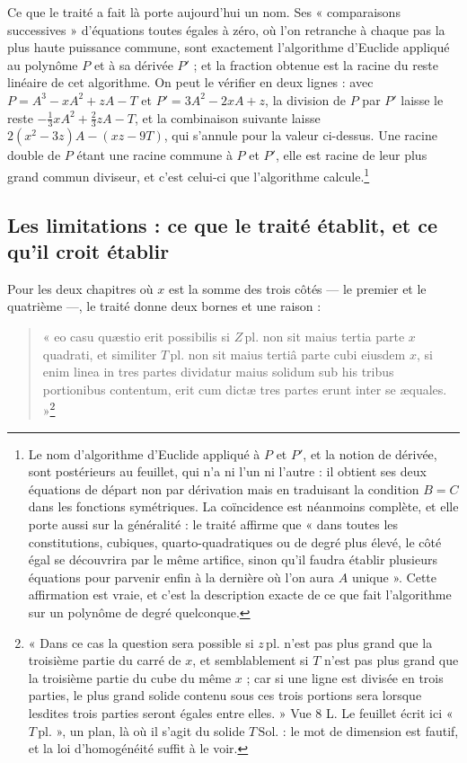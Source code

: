 \documentclass[11pt,a4paper]{article}
\begin{document}
Ce que le traité a fait là porte aujourd'hui un nom. Ses « comparaisons
successives » d'équations toutes égales à zéro, où l'on retranche à chaque pas
la plus haute puissance commune, sont exactement l'algorithme d'Euclide appliqué
au polynôme $P$ et à sa dérivée $P'$ ; et la fraction obtenue est la racine du
reste linéaire de cet algorithme. On peut le vérifier en deux lignes : avec
$P = A^3 - xA^2 + zA - T$ et $P' = 3A^2 - 2xA + z$, la division de $P$ par $P'$
laisse le reste $-\tfrac13 xA^2 + \tfrac23 zA - T$, et la combinaison suivante
laisse $2(x^2-3z)A - (xz - 9T)$, qui s'annule pour la valeur ci-dessus. Une
racine double de $P$ étant une racine commune à $P$ et $P'$, elle est racine de
leur plus grand commun diviseur, et c'est celui-ci que l'algorithme
calcule.\footnote{Le nom d'algorithme d'Euclide appliqué à $P$ et $P'$, et la
notion de dérivée, sont postérieurs au feuillet, qui n'a ni l'un ni l'autre :
il obtient ses deux équations de départ non par dérivation mais en traduisant la
condition $B = C$ dans les fonctions symétriques. La coïncidence est néanmoins
complète, et elle porte aussi sur la généralité : le traité affirme que « dans
toutes les constitutions, cubiques, quarto-quadratiques ou de degré plus élevé,
le côté égal se découvrira par le même artifice, sinon qu'il faudra établir
plusieurs équations pour parvenir enfin à la dernière où l'on aura $A$ unique ».
Cette affirmation est vraie, et c'est la description exacte de ce que fait
l'algorithme sur un polynôme de degré quelconque.}

\subsection*{Les limitations : ce que le traité établit, et ce qu'il croit établir}

Pour les deux chapitres où $x$ est la somme des trois côtés — le premier et le
quatrième —, le traité donne deux bornes et une raison :

\begin{quote}
« eo casu quæstio erit possibilis si $Z\,\mathrm{pl.}$ non sit maius tertia parte
$x$ quadrati, et similiter $T\,\mathrm{pl.}$ non sit maius tertiâ parte cubi
eiusdem $x$, si enim linea in tres partes dividatur maius solidum sub his
tribus portionibus contentum, erit cum dictæ tres partes erunt inter se
æquales. »\footnote{« Dans ce cas la question sera possible si
$z\,\mathrm{pl.}$ n'est pas plus grand que la troisième partie du carré de $x$,
et semblablement si $T$ n'est pas plus grand que la troisième partie du cube du
même $x$ ; car si une ligne est divisée en trois parties, le plus grand solide
contenu sous ces trois portions sera lorsque lesdites trois parties seront
égales entre elles. » Vue 8 L. Le feuillet écrit ici « $T\,\mathrm{pl.}$ », un
plan, là où il s'agit du solide $T\,\mathrm{Sol.}$ : le mot de dimension est
fautif, et la loi d'homogénéité suffit à le voir.}
\end{quote}
\end{document}
